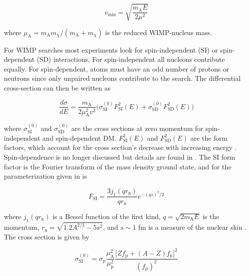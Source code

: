 \begin{equation}
v_{\mathrm{min}} = \sqrt{\frac{m_{\mathrm{A}} E}{2 \mu^{2}}}
\end{equation}

\noindent where $\mu_{\mathrm{A}} = m_{\mathrm{A}} m_{\chi} /( m_{\mathrm{A}} + m_{\chi})$ is the reduced WIMP-nucleus mass.

For WIMP searches most experiments look for spin-independent (SI) or spin-dependent (SD) interactions.  For spin-independent all nucleons
contribute equally.  For spin-dependent, atoms must have an odd number
of protons or neutrons since only unpaired nucleons contribute to the search.  The differential cross-section can then be written as

\begin{equation} \label{eq:diff_sigma_si}
\frac{d \sigma}{dE} = \frac{m_{\mathrm{A}}}{2 \mu_{\mathrm{A}}^{2} v^{2}} \big( \sigma_{\mathrm{SI}}^{(0)} F_{\mathrm{SI}}^{2}(E) +
\sigma_{\mathrm{SD}}^{(0)} F_{\mathrm{SD}}^{2}(E) \big)
\end{equation}

\noindent where $\sigma_{\mathrm{SI}}^{(0)}$ and $\sigma_{\mathrm{SD}}^{(0)}$ are the cross sections at zero momentum for
spin-independent and spin-dependent DM.  $F_{\mathrm{SI}}^{2}(E)$ and $F_{\mathrm{SD}}^{2}(E)$ are the form factors, which
account for the cross section's decrease with increasing energy .  Spin-dependence is no longer discussed but details
are found in .  The SI form factor is
the Fourier transform of the mass density ground state, and for the parameterization given in  is

\begin{equation}
F_{\mathrm{SI}} = \frac{3 j_{1}(qr_{\mathrm{n}})}{qr_{\mathrm{n}}} e^{-(qs)^{2}/2}
\end{equation}

\noindent where $j_1(q r_{\mathrm{n}})$ is a Bessel function of the first kind, $q = \sqrt{2m_{\mathrm{A}}E}$ is the momentum,
$r_{\mathrm{n}} = \sqrt{1.2A^{2/3} - 5s^{2}}$, and $s \sim 1$ fm is a measure of the nuclear skin .  The
cross section is given by

\begin{equation} \label{eq:sigma_si}
\sigma_{\mathrm{SI}}^{(0)} = \sigma_{\mathrm{p}} \frac{\mu_{\mathrm{A}}^{2}}{\mu_{\mathrm{p}}^{2}} \frac{\big[ Z f_{\mathrm{p}} +
(A - Z) f_{\mathrm{n}} \big]^{2}}{(f_{\mathrm{p}})^{2}}
\end{equation}

